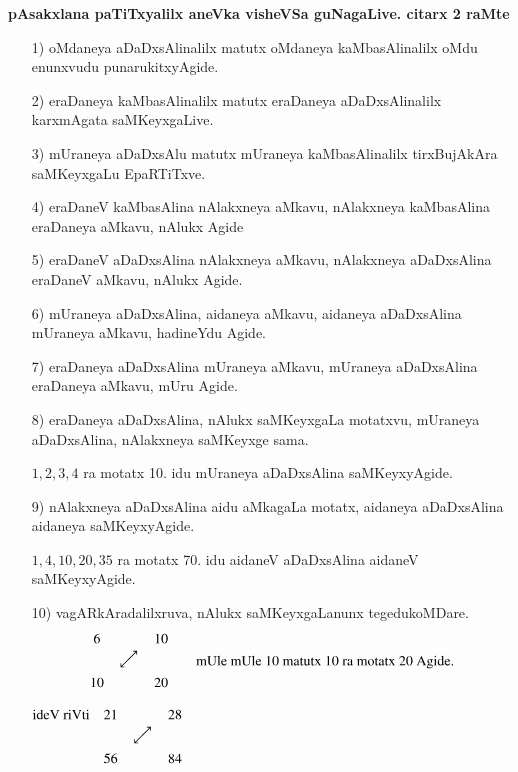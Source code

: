 \noindent
\textbf{pAsakxlana paTiTxyalilx aneVka visheVSa guNagaLive. citarx {\rm 2} raMte}
\begin{enumerate}
\item[{\rm 1)}] oMdaneya aDaDxsAlinalilx matutx oMdaneya kaMbasAlinalilx oMdu enunxvudu punarukitxyAgide.

\item[{\rm 2)}] eraDaneya kaMbasAlinalilx matutx eraDaneya aDaDxsAlinalilx karxmAgata saMKeyxgaLive.

\item[{\rm 3)}] mUraneya aDaDxsAlu matutx mUraneya kaMbasAlinalilx tirxBujAkAra saMKeyxgaLu EpaRTiTxve.

\item[{\rm 4)}]eraDaneV kaMbasAlina nAlakxneya aMkavu, nAlakxneya kaMbasAlina eraDaneya aMkavu, nAlukx Agide

\item[{\rm 5)}] eraDaneV aDaDxsAlina nAlakxneya aMkavu, nAlakxneya aDaDxsAlina eraDaneV aMkavu, nAlukx Agide.

\item[{\rm 6)}] mUraneya aDaDxsAlina, aidaneya aMkavu, aidaneya aDaDxsAlina mUraneya aMkavu, hadineYdu Agide.

\item[{\rm 7)}] eraDaneya aDaDxsAlina mUraneya aMkavu, mUraneya aDaDxsAlina eraDaneya aMkavu, mUru Agide.

\item[{\rm 8)}] eraDaneya aDaDxsAlina, nAlukx saMKeyxgaLa motatxvu, mUraneya aDaDxsAlina, nAlakxneya saMKeyxge sama.

$1, 2, 3, 4$ ra motatx {\rm 10}. idu mUraneya aDaDxsAlina saMKeyxyAgide.

\item[{\rm 9)}] nAlakxneya aDaDxsAlina aidu aMkagaLa motatx, aidaneya aDaDxsAlina aidaneya saMKeyxyAgide.

$1, 4, 10, 20, 35$ ra motatx {\rm 70}. idu aidaneV aDaDxsAlina aidaneV saMKeyxyAgide.

\item[{\rm 10)}]  vagARkAradalilxruva, nAlukx saMKeyxgaLanunx tegedukoMDare. 
$$
\begin{matrix}
6 && 10\\
& \rotatebox{45}{$\longleftrightarrow$} & \\
10 && 20
\end{matrix}
\qquad \text{mUle mUle {\rm 10} matutx {\rm 10} ra motatx {\rm 20} Agide.}
$$
\begin{center}
$\begin{matrix}
\text{ideV riVti} & 21 && 28\\
&& \rotatebox{45}{$\longleftrightarrow$} & \\
& 56 && 84
\end{matrix}$
\quad {}\\[-0.55cm]
\end{center}


\end{enumerate}
